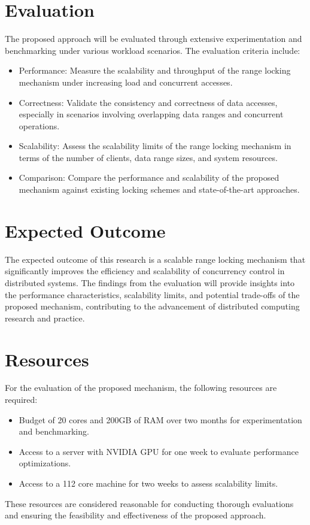 \section{Evaluation}
The proposed approach will be evaluated through extensive experimentation and benchmarking under various workload scenarios. The evaluation criteria include:
\begin{itemize}
    \item Performance: Measure the scalability and throughput of the range locking mechanism under increasing load and concurrent accesses.
    \item Correctness: Validate the consistency and correctness of data accesses, especially in scenarios involving overlapping data ranges and concurrent operations.
    \item Scalability: Assess the scalability limits of the range locking mechanism in terms of the number of clients, data range sizes, and system resources.
    \item Comparison: Compare the performance and scalability of the proposed mechanism against existing locking schemes and state-of-the-art approaches.
\end{itemize}

\section{Expected Outcome}
The expected outcome of this research is a scalable range locking mechanism that significantly improves the efficiency and scalability of concurrency control in distributed systems. The findings from the evaluation will provide insights into the performance characteristics, scalability limits, and potential trade-offs of the proposed mechanism, contributing to the advancement of distributed computing research and practice.

\section{Resources}
For the evaluation of the proposed mechanism, the following resources are required:
\begin{itemize}
    \item Budget of 20 cores and 200GB of RAM over two months for experimentation and benchmarking.
    \item Access to a server with NVIDIA GPU for one week to evaluate performance optimizations.
    \item Access to a 112 core machine for two weeks to assess scalability limits.
\end{itemize}
These resources are considered reasonable for conducting thorough evaluations and ensuring the feasibility and effectiveness of the proposed approach.
